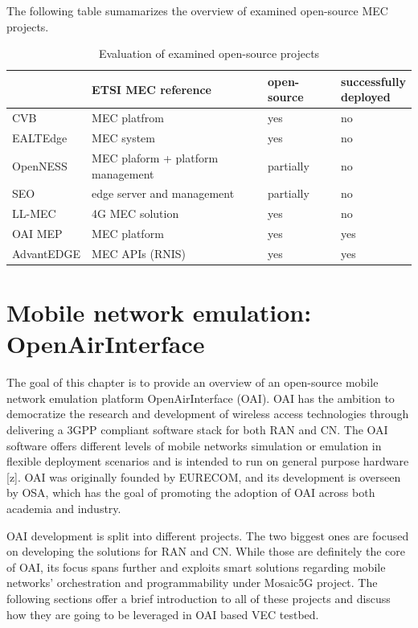 \documentclass[12pt,a4paper,twoside]{report}
\begin{document}
The following table sumamarizes the overview of examined open-source MEC projects.
\begin{table}[!ht]
    \centering
	\caption{Evaluation of examined open-source projects}
    \begin{tabular}{|l|l|l|l|}
    \hline
        & ETSI MEC reference & open-source & \Longunderstack{successfully\\deployed} \\ \hline
        CVB & MEC platfrom & yes & no \\ \hline
        EALTEdge & MEC system & yes & no \\ \hline
        OpenNESS & MEC plaform + platform management & partially & no \\ \hline
        SEO & edge server and management & partially & no \\ \hline
        LL-MEC & 4G MEC solution & yes & no \\ \hline
        OAI MEP & MEC platform & yes & yes \\ \hline
        AdvantEDGE & MEC APIs (RNIS) & yes & yes \\ \hline
    \end{tabular}
\end{table}

\chapter{Mobile network emulation: \texorpdfstring{\\ \mbox{OpenAirInterface}}{OpenAirInterface}}
The goal of this chapter is to provide an overview of an open-source mobile network emulation platform OpenAirInterface (OAI). OAI has the ambition to democratize the research and development of wireless access technologies through delivering a 3GPP compliant software stack for both RAN and CN. The OAI software offers different levels of mobile networks simulation or emulation in flexible deployment scenarios and is intended to run on general purpose hardware [z]. OAI was originally founded by EURECOM, and its development is overseen by OSA, which has the goal of promoting the adoption of OAI across both academia and industry. 

OAI development is split into different projects. The two biggest ones are focused on developing the solutions for RAN and CN. While those are definitely the core of OAI, its focus spans further and exploits smart solutions regarding mobile networks’ orchestration and programmability under Mosaic5G project. The following sections offer a brief introduction to all of these projects and discuss how they are going to be leveraged in OAI based VEC testbed.
\end{document}
